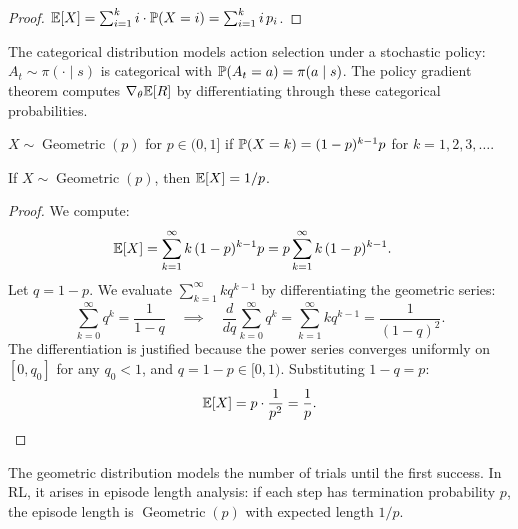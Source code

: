 \documentclass[11pt,a4paper]{article}
\begin{document}
\begin{proof}
$\mathbb{E}[X] = \sum_{i=1}^k i \cdot \mathbb{P}(X = i) = \sum_{i=1}^k i\, p_i$.
\end{proof}

\begin{rlconnection}[title={Connection to RL}]
The categorical distribution models action selection under a stochastic
policy: $A_t \sim \pi(\cdot \mid s)$ is categorical with
$\mathbb{P}(A_t = a) = \pi(a \mid s)$. The policy gradient theorem computes
$\nabla_\theta \mathbb{E}[R]$ by differentiating through these categorical
probabilities.
\end{rlconnection}

\begin{definition}
\label{def:geometric}
$X \sim \operatorname{Geometric}(p)$ for $p \in (0,1]$ if
$\mathbb{P}(X = k) = (1-p)^{k-1} p$ for $k = 1, 2, 3, \ldots$.
\end{definition}

\begin{proposition}
\label{prop:geometric_E}
If $X \sim \operatorname{Geometric}(p)$, then $\mathbb{E}[X] = 1/p$.
\end{proposition}

\begin{proof}
We compute:
\begin{align}
  \mathbb{E}[X] &= \sum_{k=1}^\infty k\, (1-p)^{k-1} p
  = p \sum_{k=1}^\infty k\, (1-p)^{k-1}.
  \label{eq:geometric_E_start}
\end{align}
Let $q = 1 - p$. We evaluate $\sum_{k=1}^\infty k q^{k-1}$ by
differentiating the geometric series:
\[
  \sum_{k=0}^\infty q^k = \frac{1}{1 - q}
  \quad \implies \quad
  \frac{d}{dq} \sum_{k=0}^\infty q^k
  = \sum_{k=1}^\infty k q^{k-1} = \frac{1}{(1-q)^2}.
\]
The differentiation is justified because the power series converges
uniformly on $[0, q_0]$ for any $q_0 < 1$, and $q = 1 - p \in [0, 1)$.
Substituting $1 - q = p$:
\[
  \mathbb{E}[X] = p \cdot \frac{1}{p^2} = \frac{1}{p}. \qedhere
\]
\end{proof}

\begin{remark}
The geometric distribution models the number of trials until the first
success. In RL, it arises in episode length analysis: if each step has
termination probability $p$, the episode length is
$\operatorname{Geometric}(p)$ with expected length $1/p$.
\end{remark}

\end{document}
